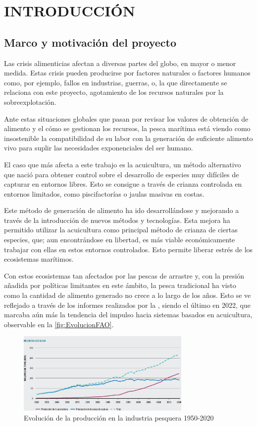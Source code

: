 \section{INTRODUCCIÓN}

\subsection{Marco y motivación del proyecto}

Las crisis alimenticias afectan a diversas partes del globo, en mayor o menor medida. Estas crisis pueden producirse por factores naturales o factores humanos como, por ejemplo, 
fallos en industrias, guerras, o, la que directamente se relaciona con este proyecto, agotamiento de los recursos naturales por la sobreexplotación.

Ante estas situaciones globales que pasan por revisar los valores de obtención de alimento y el cómo se gestionan los recursos, la pesca marítima está viendo como insostenible la 
compatibilidad de su labor con la generación de suficiente alimento vivo para suplir las necesidades exponenciales del ser humano.

El caso que más afecta a este trabajo es la acuicultura, un método alternativo que nació para obtener control sobre el desarrollo de especies muy difíciles de capturar en entornos 
libres. Esto se consigue a través de crianza controlada en entornos limitados, como piscifactorías o jaulas masivas en costas.

Este método de generación de alimento ha ido desarrollándose y mejorando a través de la introducción de nuevos métodos y tecnologías. Esta mejora ha permitido utilizar la acuicultura 
como principal método de crianza de ciertas especies, que; aun encontrándose en libertad, es más viable económicamente trabajar con ellas en estos entornos controlados. Esto permite liberar 
estrés de los ecosistemas marítimos.

Con estos ecosistemas tan afectados por las pescas de arrastre y, con la presión añadida por políticas limitantes en este ámbito, la pesca tradicional ha visto como la cantidad de alimento 
generado no crece a lo largo de los años. Esto se ve reflejado a través de los informes realizados por la \textit{}, siendo el último en 2022, que marcaba aún más la tendencia del 
impulso hacia sistemas basados en acuicultura, observable en la \autoref{fig:EvolucionFAO}.

\begin{figure}[h]
    \centering
    \includegraphics[width=0.75\textwidth]{images/2/EvolucionFAO.jpg}
    \caption{Evolución de la producción en la industria pesquera 1950-2020\cite{EstadoMundialPesca}}
    \label{fig:EvolucionFAO}
\end{figure}

